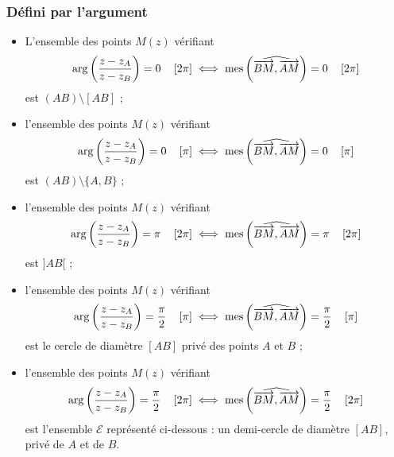 \begin{fiche}
            \subsubsection*{D\'efini par l'argument}
                  \begin{itemize}
	                        \item L'ensemble des points $M(z)$ v\'erifiant
	                              \[
	                                    \mathrm{arg}\left( \frac{z-z_A}{z-z_B} \right) = 0 \quad \left[ 2\pi \right]
	                                          \iff
	                                    \mathrm{mes}\left( \widehat{ \overrightarrow{BM} , \overrightarrow{AM} } \right) = 0 \quad \left[ 2\pi \right]
	                              \]
                              est
                              $(AB) \setminus [AB]$ ;
	                        \item l'ensemble des points $M(z)$ v\'erifiant
	                              \[
	                                    \mathrm{arg}\left( \frac{z-z_A}{z-z_B} \right) = 0 \quad \left[ \pi \right]
	                                          \iff
	                                    \mathrm{mes}\left( \widehat{ \overrightarrow{BM} , \overrightarrow{AM} } \right) = 0 \quad \left[ \pi \right]
	                              \]
                              est
                              $(AB) \setminus \{A,B\}$ ;
	                        \item l'ensemble des points $M(z)$ v\'erifiant
	                              \[
	                                    \mathrm{arg}\left( \frac{z-z_A}{z-z_B} \right) = \pi \quad \left[ 2\pi \right]
	                                          \iff
	                                    \mathrm{mes}\left( \widehat{ \overrightarrow{BM} , \overrightarrow{AM} } \right) = \pi \quad \left[ 2\pi \right]
	                              \]
                              est 
                              $]AB[$ ;
	                        \item l'ensemble des points $M(z)$ v\'erifiant
	                              \[
	                                    \mathrm{arg}\left( \frac{z-z_A}{z-z_B} \right) = \frac{\pi}{2} \quad \left[ \pi \right]
	                                          \iff
	                                    \mathrm{mes}\left( \widehat{ \overrightarrow{BM} , \overrightarrow{AM} } \right) = \frac{\pi}{2} \quad \left[ \pi \right]
	                              \]
                              est
                              le cercle de diam\`etre $[AB]$ priv\'e des points $A$ et $B$ ;
	                        \item l'ensemble des points $M(z)$ v\'erifiant
	                              \[
	                                    \mathrm{arg}\left( \frac{z-z_A}{z-z_B} \right) = \frac{\pi}{2} \quad \left[ 2\pi \right]
	                                          \iff
	                                    \mathrm{mes}\left( \widehat{ \overrightarrow{BM} , \overrightarrow{AM} } \right) = \frac{\pi}{2} \quad \left[ 2\pi \right]
	                              \]
                              est
                              l'ensemble $\mathscr{E}$ repr\'esent\'e ci-dessous : un demi-cercle de diam\`etre $[AB]$, priv\'e de $A$ et de $B$.
                              

\end{itemize}
\end{fiche}
